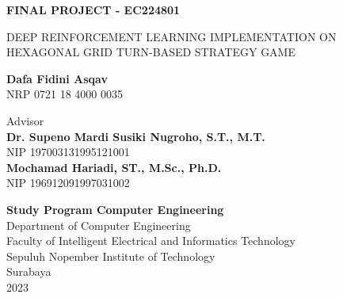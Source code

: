 \begin{flushleft}
  \fontsize{14pt}{17}
  \selectfont
  \textbf{FINAL PROJECT - EC224801}
\end{flushleft}


\vspace{5ex}

\begin{flushleft}
  \fontsize{18pt}{22}
  \selectfont
  DEEP REINFORCEMENT LEARNING IMPLEMENTATION ON HEXAGONAL 
  GRID TURN-BASED STRATEGY GAME
\end{flushleft}

\vspace{6ex}

\begin{flushleft}
  \fontsize{14pt}{17}
  \selectfont
  \textbf{Dafa Fidini Asqav}
  \\
  NRP 0721 18 4000 0035
\end{flushleft}

\vspace{6ex}

\begin{flushleft}
  \fontsize{14pt}{17}
  \selectfont
  Advisor \\
  \textbf{Dr. Supeno Mardi Susiki Nugroho, S.T., M.T.} \\
  NIP 197003131995121001 \\
  \textbf{Mochamad Hariadi, ST., M.Sc., Ph.D.} \\
  NIP 196912091997031002 \\
\end{flushleft}

\vspace{6ex}

\begin{flushleft}
  \fontsize{12pt}{15}
  \selectfont
  \textbf{Study Program Computer Engineering}\\
  Department of Computer Engineering\\
  Faculty of Intelligent Electrical and Informatics Technology\\
  Sepuluh Nopember Institute of Technology\\
  Surabaya\\
  2023
\end{flushleft}
